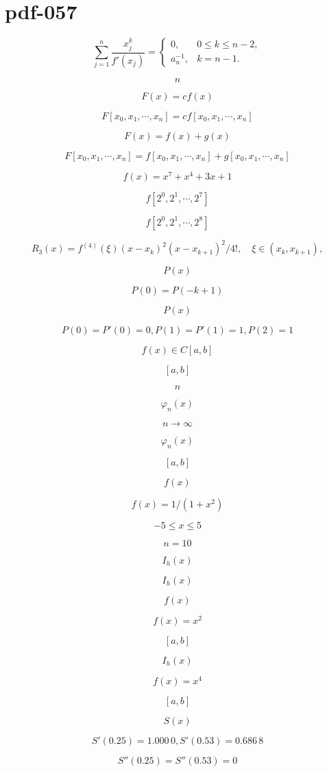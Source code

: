 \documentclass[fontset=fandol]{ctexart}
\begin{document}
\section*{pdf-057}

\[\sum_{j=1}^n\frac{x_j^k}{f'(x_j)}=\begin{cases}0,&0\leqslant k\leqslant n-2,\\a_n^{-1},&k=n-1.\end{cases}\]

\[n\]

\[F(x)=cf(x)\]

\[F[x_0,x_1,\cdots,x_n]=cf[x_0,x_1,\cdots,x_n]\]

\[F(x)=f(x)+g(x)\]

\[F[x_0,x_1,\cdots,x_n]=f[x_0,x_1,\cdots,x_n]+g[x_0,x_1,\cdots,x_n]\]

\[f(x)=x^7+x^4+3x+1\]

\[f[2^0,2^1,\cdots,2^7]\]

\[f[2^0,2^1,\cdots,2^8]\]

\[R_3(x)=f^{(4)}(\xi)(x-x_k)^2(x-x_{k+1})^2/4!,\quad\xi\in(x_k,x_{k+1}),\]

\[P(x)\]

\[P(0)=P(-k+1)\]

\[P(x)\]

\[P(0)=P'(0)=0,P(1)=P'(1)=1,P(2)=1\]

\[f(x)\in C[a,b]\]

\[[a,b]\]

\[n\]

\[\varphi_n(x)\]

\[n\to\infty\]

\[\varphi_n(x)\]

\[[a,b]\]

\[f(x)\]

\[f(x)=1/(1+x^2)\]

\[-5\leqslant x\leqslant5\]

\[n=10\]

\[I_h(x)\]

\[I_h(x)\]

\[f(x)\]

\[f(x)=x^2\]

\[[a,b]\]

\[I_h(x)\]

\[f(x)=x^4\]

\[[a,b]\]

\[S(x)\]

\[S'(0.25)=1.000\,0,S'(0.53)=0.686\,8\]

\[S''(0.25)=S''(0.53)=0\]
\end{document}
